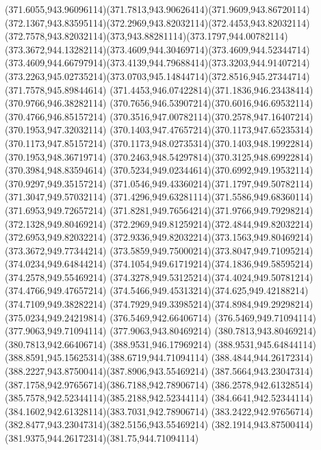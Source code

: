 {{	\curveto(371.6055,943.96096114)(371.7813,943.90626414)(371.9609,943.86720114)
	\curveto(372.1367,943.83595114)(372.2969,943.82032114)(372.4453,943.82032114)
	\curveto(372.7578,943.82032114)(373,943.88281114)(373.1797,944.00782114)
	\curveto(373.3672,944.13282114)(373.4609,944.30469714)(373.4609,944.52344714)
	\curveto(373.4609,944.66797914)(373.4139,944.79688414)(373.3203,944.91407214)
	\curveto(373.2263,945.02735214)(373.0703,945.14844714)(372.8516,945.27344714)
	\lineto(371.7578,945.89844614)
	\curveto(371.4453,946.07422814)(371.1836,946.23438414)(370.9766,946.38282114)
	\curveto(370.7656,946.53907214)(370.6016,946.69532114)(370.4766,946.85157214)
	\curveto(370.3516,947.00782114)(370.2578,947.16407214)(370.1953,947.32032114)
	\curveto(370.1403,947.47657214)(370.1173,947.65235314)(370.1173,947.85157214)
	\curveto(370.1173,948.02735314)(370.1403,948.19922814)(370.1953,948.36719714)
	\curveto(370.2463,948.54297814)(370.3125,948.69922814)(370.3984,948.83594614)
	\curveto(370.5234,949.02344614)(370.6992,949.19532114)(370.9297,949.35157214)
	\curveto(371.0546,949.43360214)(371.1797,949.50782114)(371.3047,949.57032114)
	\curveto(371.4296,949.63281114)(371.5586,949.68360114)(371.6953,949.72657214)
	\curveto(371.8281,949.76564214)(371.9766,949.79298214)(372.1328,949.80469214)
	\curveto(372.2969,949.81259214)(372.4844,949.82032214)(372.6953,949.82032214)
	\curveto(372.9336,949.82032214)(373.1563,949.80469214)(373.3672,949.77344214)
	\curveto(373.5859,949.75000214)(373.8047,949.71095214)(374.0234,949.64844214)
	\curveto(374.1054,949.61719214)(374.1836,949.58595214)(374.2578,949.55469214)
	\curveto(374.3278,949.53125214)(374.4024,949.50781214)(374.4766,949.47657214)
	\curveto(374.5466,949.45313214)(374.625,949.42188214)(374.7109,949.38282214)
	\curveto(374.7929,949.33985214)(374.8984,949.29298214)(375.0234,949.24219814)
	\closepath
	\moveto(376.5469,942.66406714)
	\lineto(376.5469,949.71094114)
	\lineto(377.9063,949.71094114)
	\lineto(377.9063,943.80469214)
	\lineto(380.7813,943.80469214)
	\lineto(380.7813,942.66406714)
	\closepath
	\moveto(388.9531,946.17969214)
	\curveto(388.9531,945.64844114)(388.8591,945.15625314)(388.6719,944.71094114)
	\curveto(388.4844,944.26172314)(388.2227,943.87500414)(387.8906,943.55469214)
	\curveto(387.5664,943.23047314)(387.1758,942.97656714)(386.7188,942.78906714)
	\curveto(386.2578,942.61328514)(385.7578,942.52344114)(385.2188,942.52344114)
	\curveto(384.6641,942.52344114)(384.1602,942.61328114)(383.7031,942.78906714)
	\curveto(383.2422,942.97656714)(382.8477,943.23047314)(382.5156,943.55469214)
	\curveto(382.1914,943.87500414)(381.9375,944.26172314)(381.75,944.71094114)
}}
